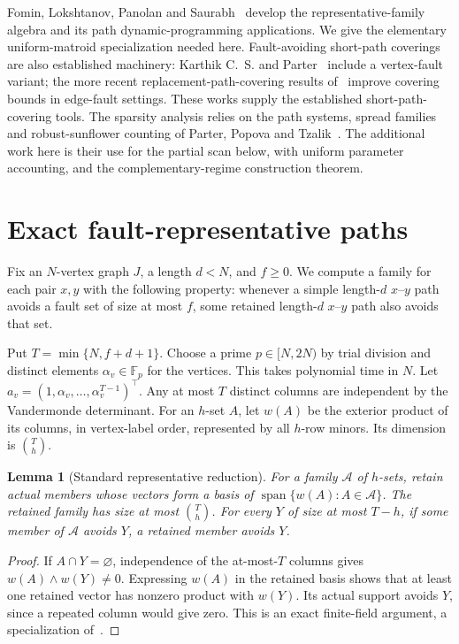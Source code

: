 \documentclass[acmsmall,11pt,screen,nonacm]{acmart}
\newcommand{\F}{\mathbb{F}}
\newtheorem{lemma}[theorem]{Lemma}
\begin{document}
Fomin, Lokshtanov, Panolan and Saurabh~\cite{FLPS16} develop the
representative-family algebra and its path dynamic-programming
applications. We give the elementary uniform-matroid specialization needed
here. Fault-avoiding short-path coverings are also established machinery:
Karthik C.~S. and Parter~\cite{KP23} include a vertex-fault variant;
the more recent replacement-path-covering results
of~\cite{BCCCS26,BCCS26} improve covering bounds in edge-fault settings.
These works supply the established short-path-covering tools. The sparsity
analysis relies on the path systems, spread families and robust-sunflower
counting of Parter, Popova and Tzalik~\cite{PPT26}. The additional work
here is their use for the partial scan below, with uniform parameter
accounting, and the complementary-regime construction theorem.

\section{Exact fault-representative paths}\label{sec:represent}

Fix an $N$-vertex graph $J$, a length $d<N$, and $f\ge0$. We compute a
family for each pair $x,y$ with the following property: whenever a simple
length-$d$ $x$--$y$ path avoids a fault set of size at most $f$, some
retained length-$d$ $x$--$y$ path also avoids that set.

Put $T=\min\{N,f+d+1\}$. Choose a prime $p\in[N,2N)$ by trial division
and distinct elements $\alpha_v\in\F_p$ for the vertices. This takes
polynomial time in $N$. Let $a_v=(1,\alpha_v,\ldots,\alpha_v^{T-1})^\top$.
Any at most $T$ distinct columns are independent by the Vandermonde
determinant. For an $h$-set $A$, let $w(A)$ be the exterior product of its
columns, in vertex-label order, represented by all $h$-row minors. Its
dimension is $\binom{T}{h}$.

\begin{lemma}[Standard representative reduction]\label{lem:basis}
For a family $\mathcal A$ of $h$-sets, retain actual members whose vectors
form a basis of $\operatorname{span}\{w(A):A\in\mathcal A\}$. The retained
family has size at most $\binom{T}{h}$. For every $Y$ of size at most $T-h$,
if some member of $\mathcal A$ avoids $Y$, a retained member avoids $Y$.
\end{lemma}
\begin{proof}
If $A\cap Y=\varnothing$, independence of the at-most-$T$ columns gives
$w(A)\wedge w(Y)\ne0$. Expressing $w(A)$ in the retained basis shows that
at least one retained vector has nonzero product with $w(Y)$. Its actual
support avoids $Y$, since a repeated column would give zero. This is an
exact finite-field argument, a specialization of~\cite{FLPS16}.
\end{proof}
\end{document}
